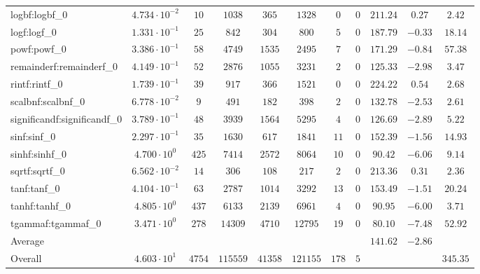\begin{tabular}{|l|c|c|c|c|c|c|c|c|c|c|}
logbf:logbf\_0               & $ 4.734 \cdot 10^{-2} $ & $ 10     $ & $ 1038   $ & $ 365   $ & $ 1328   $ & $ 0   $ & $ 0 $ & $ 211.24      $ & $ 0.27    $ & $ 2.42    $ \\
logf:logf\_0                 & $ 1.331 \cdot 10^{-1} $ & $ 25     $ & $ 842    $ & $ 304   $ & $ 800    $ & $ 5   $ & $ 0 $ & $ 187.79      $ & $ -0.33   $ & $ 18.14   $ \\
powf:powf\_0                 & $ 3.386 \cdot 10^{-1} $ & $ 58     $ & $ 4749   $ & $ 1535  $ & $ 2495   $ & $ 7   $ & $ 0 $ & $ 171.29      $ & $ -0.84   $ & $ 57.38   $ \\
remainderf:remainderf\_0     & $ 4.149 \cdot 10^{-1} $ & $ 52     $ & $ 2876   $ & $ 1055  $ & $ 3231   $ & $ 2   $ & $ 0 $ & $ 125.33      $ & $ -2.98   $ & $ 3.47    $ \\
rintf:rintf\_0               & $ 1.739 \cdot 10^{-1} $ & $ 39     $ & $ 917    $ & $ 366   $ & $ 1521   $ & $ 0   $ & $ 0 $ & $ 224.22      $ & $ 0.54    $ & $ 2.68    $ \\
scalbnf:scalbnf\_0           & $ 6.778 \cdot 10^{-2} $ & $ 9      $ & $ 491    $ & $ 182   $ & $ 398    $ & $ 2   $ & $ 0 $ & $ 132.78      $ & $ -2.53   $ & $ 2.61    $ \\
significandf:significandf\_0 & $ 3.789 \cdot 10^{-1} $ & $ 48     $ & $ 3939   $ & $ 1564  $ & $ 5295   $ & $ 4   $ & $ 0 $ & $ 126.69      $ & $ -2.89   $ & $ 5.22    $ \\
sinf:sinf\_0                 & $ 2.297 \cdot 10^{-1} $ & $ 35     $ & $ 1630   $ & $ 617   $ & $ 1841   $ & $ 11  $ & $ 0 $ & $ 152.39      $ & $ -1.56   $ & $ 14.93   $ \\
sinhf:sinhf\_0               & $ 4.700 \cdot 10^{0}  $ & $ 425    $ & $ 7414   $ & $ 2572  $ & $ 8064   $ & $ 10  $ & $ 0 $ & $ 90.42       $ & $ -6.06   $ & $ 9.14    $ \\
sqrtf:sqrtf\_0               & $ 6.562 \cdot 10^{-2} $ & $ 14     $ & $ 306    $ & $ 108   $ & $ 217    $ & $ 2   $ & $ 0 $ & $ 213.36      $ & $ 0.31    $ & $ 2.36    $ \\
tanf:tanf\_0                 & $ 4.104 \cdot 10^{-1} $ & $ 63     $ & $ 2787   $ & $ 1014  $ & $ 3292   $ & $ 13  $ & $ 0 $ & $ 153.49      $ & $ -1.51   $ & $ 20.24   $ \\
tanhf:tanhf\_0               & $ 4.805 \cdot 10^{0}  $ & $ 437    $ & $ 6133   $ & $ 2139  $ & $ 6961   $ & $ 4   $ & $ 0 $ & $ 90.95       $ & $ -6.00   $ & $ 3.71    $ \\
tgammaf:tgammaf\_0           & $ 3.471 \cdot 10^{0}  $ & $ 278    $ & $ 14309  $ & $ 4710  $ & $ 12795  $ & $ 19  $ & $ 0 $ & $ 80.10       $ & $ -7.48   $ & $ 52.92   $ \\
\hline
Average                      & $                     $ & $        $ & $        $ & $       $ & $        $ & $     $ & $   $ & $ 141.62      $ & $ -2.86   $ & $         $ \\
\hline
Overall                      & $ 4.603 \cdot 10^{1}  $ & $ 4754   $ & $ 115559 $ & $ 41358 $ & $ 121155 $ & $ 178 $ & $ 5 $ & $             $ & $         $ & $ 345.35  $ \\
\hline
\end{tabular}
